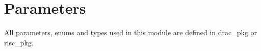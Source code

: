 \section{Parameters}
\label{chapter3}

All parameters, enums and types used in this module are defined in drac\_pkg or risc\_pkg.
